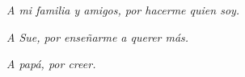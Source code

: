\thispagestyle{empty}

\vspace*{\fill}

\begin{flushright}
\textit{A mi familia y amigos, por hacerme quien soy.}

\textit{A Sue, por enseñarme a querer más.}

\textit{A papá, por creer.}
\end{flushright}

\vspace*{\fill}
